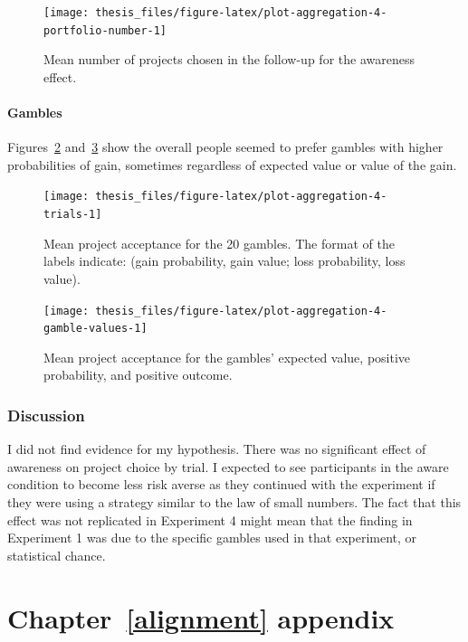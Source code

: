 \documentclass[a4paper, nobind, dvipsnames]{templates/ociamthesis}
\theoremstyle{definition}
\theoremstyle{definition}
\theoremstyle{definition}
\theoremstyle{definition}
\theoremstyle{remark}
\begin{document}
\begin{figure}
\texttt{[image: thesis\_files/figure-latex/plot-aggregation-4-portfolio-number-1]} \caption{Mean number of projects chosen in the follow-up for the awareness effect.}\label{fig:plot-aggregation-4-portfolio-number}
\end{figure}

\subsubsection{Gambles}

Figures~\ref{fig:plot-aggregation-4-trials}
and~\ref{fig:plot-aggregation-4-gamble-values} show the
overall people seemed to prefer gambles with higher probabilities of gain,
sometimes regardless of expected value or value of the gain.



\begin{figure}
\texttt{[image: thesis\_files/figure-latex/plot-aggregation-4-trials-1]} \caption{Mean project acceptance for the 20 gambles. The format of the labels indicate: (gain probability, gain value; loss probability, loss value).}\label{fig:plot-aggregation-4-trials}
\end{figure}



\begin{figure}
\texttt{[image: thesis\_files/figure-latex/plot-aggregation-4-gamble-values-1]} \caption{Mean project acceptance for the gambles' expected value, positive probability, and positive outcome.}\label{fig:plot-aggregation-4-gamble-values}
\end{figure}

\subsection{Discussion}

I did not find evidence for my hypothesis. There was no significant effect of
awareness on project choice by trial. I expected to see participants in the
aware condition to become less risk averse as they continued with the experiment
if they were using a strategy similar to the law of small numbers. The fact that
this effect was not replicated in Experiment 4 might mean that the finding in
Experiment 1 was due to the specific gambles used in that experiment, or
statistical chance.

\hypertarget{alignment-appendix}{%
\chapter{Chapter~\ref{alignment} appendix}\label{alignment-appendix}}
\end{document}
